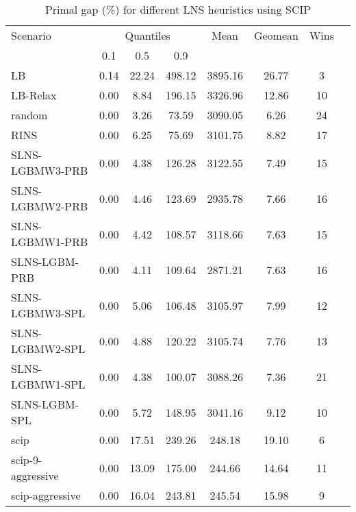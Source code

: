 \documentclass[3p, authoryear, times]{elsarticle}
\begin{document}
\begin{table}[h]
\centering
\caption{Primal gap (\%) for different LNS heuristics using SCIP}
\label{tab:lns:primal_gap_scip}
\begin{tabular}{lccccccc}
\toprule
{Scenario} & \multicolumn{3}{c}{Quantiles} & {Mean} & {Geomean} & {Wins} \\
{} & {0.1} & {0.5} & {0.9} & {} & {} & {} \\
\midrule
LB & 0.14 & 22.24 & 498.12 & 3895.16 & 26.77 & 3 \\
LB-Relax & 0.00 & 8.84 & 196.15 & 3326.96 & 12.86 & 10 \\
random & 0.00 & 3.26 & 73.59 & 3090.05 & 6.26 & 24 \\
RINS & 0.00 & 6.25 & 75.69 & 3101.75 & 8.82 & 17 \\
SLNS-LGBMW3-PRB & 0.00 & 4.38 & 126.28 & 3122.55 & 7.49 & 15 \\
SLNS-LGBMW2-PRB & 0.00 & 4.46 & 123.69 & 2935.78 & 7.66 & 16 \\
SLNS-LGBMW1-PRB & 0.00 & 4.42 & 108.57 & 3118.66 & 7.63 & 15 \\
SLNS-LGBM-PRB & 0.00 & 4.11 & 109.64 & 2871.21 & 7.63 & 16 \\
SLNS-LGBMW3-SPL & 0.00 & 5.06 & 106.48 & 3105.97 & 7.99 & 12 \\
SLNS-LGBMW2-SPL & 0.00 & 4.88 & 120.22 & 3105.74 & 7.76 & 13 \\
SLNS-LGBMW1-SPL & 0.00 & 4.38 & 100.07 & 3088.26 & 7.36 & 21 \\
SLNS-LGBM-SPL & 0.00 & 5.72 & 148.95 & 3041.16 & 9.12 & 10 \\
scip & 0.00 & 17.51 & 239.26 & 248.18 & 19.10 & 6 \\
scip-9-aggressive & 0.00 & 13.09 & 175.00 & 244.66 & 14.64 & 11 \\
scip-aggressive & 0.00 & 16.04 & 243.81 & 245.54 & 15.98 & 9 \\
\bottomrule
\end{tabular}
\end{table}
\end{document}
